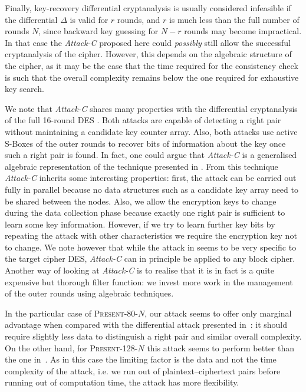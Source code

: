 \documentclass{llncs}
\newcommand{\PRESENT}{\textsc{Present}\xspace}
\begin{document}
Finally, key-recovery differential cryptanalysis is usually
considered infeasible if the differential $\Delta$ is valid for $r$ rounds, and
$r$ is much less than the full number of rounds $N$, since backward key
guessing for $N-r$ rounds may become impractical. In that case the
\emph{Attack-C} proposed here could \emph{possibly} still allow the successful
cryptanalysis of the cipher. However, this depends on the algebraic structure of
the cipher, as it may be the case that the time required for the consistency
check is such that the overall complexity remains below the one required for
exhaustive key search.

We note that \emph{Attack-C} shares many properties with the differential
cryptanalysis of the full 16-round DES \cite{fulldes-dc}. Both attacks are
capable of detecting a right pair without maintaining a candidate key
counter array. Also, both attacks use active S-Boxes of the outer rounds to
recover bits of information about the key once such a right pair is found.
In fact, one could argue that \emph{Attack-C} is a generalised algebraic
representation of the technique presented in \cite{fulldes-dc}. From this
technique \emph{Attack-C} inherits some interesting properties: first, the
attack can be carried out fully in parallel because no data structures such as a
candidate key array need to be shared between the nodes. Also, we allow the
encryption keys to change during the data collection phase because exactly one
right pair is sufficient to learn some key information.
However, if we try to learn further key bits by repeating the attack with
other characteristics we require the encryption key not to change. We note
however that while the attack in \cite{fulldes-dc} seems to be very specific to
the target cipher DES, \emph{Attack-C} can in principle be applied to any
block cipher. Another way of looking at \emph{Attack-C} is to realise that it is
in fact is a quite expensive but thorough filter function: we invest more work
in
the management of the outer rounds using algebraic techniques.

In the particular case of \PRESENT-80-$N$, our attack seems to offer only
marginal advantage when compared with the differential attack
presented in~\cite{present-dc:africacrypt}: it should require slightly less data
to distinguish a right pair and similar overall complexity.
On the other hand, for \PRESENT-128-$N$ this attack seems to perform better
than the one in~\cite{present-dc:africacrypt}. As in this case the limiting factor is the
data and not the time complexity of the attack, i.e. we run out of
plaintext--ciphertext pairs before running out of computation time, the attack
has more flexibility.
\end{document}
